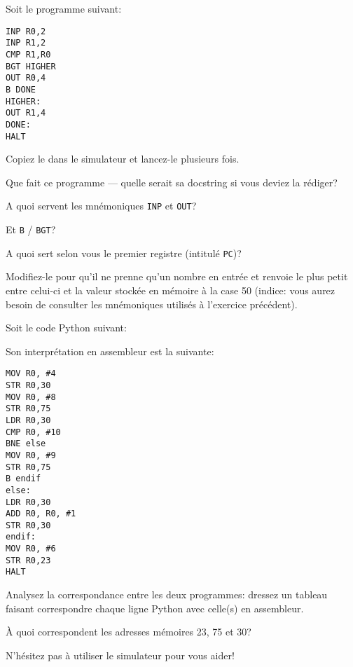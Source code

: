 \documentclass[12pt]{article}
\begin{document}
	 \begin{MonExo}
	 	Soit le programme suivant:
	 	\begin{verbatim}
INP R0,2
INP R1,2
CMP R1,R0
BGT HIGHER
OUT R0,4
B DONE
HIGHER:
OUT R1,4
DONE:
HALT
	 	\end{verbatim}
	 	Copiez le dans le simulateur et lancez-le plusieurs fois.
	 	\begin{alphenum}
	 		\item Que fait ce programme --- quelle serait sa docstring si vous deviez la rédiger?
	 		\item A quoi servent les mnémoniques \texttt{INP} et \texttt{OUT}?
	 		\item Et \texttt{B} / \texttt{BGT}?
	 		\item A quoi sert selon vous le premier registre (intitulé \texttt{PC})?
	 		\item Modifiez-le pour qu'il ne prenne qu'un nombre en entrée et renvoie le plus petit entre celui-ci et la valeur stockée en mémoire à la case 50 (indice: vous aurez besoin de consulter les mnémoniques utilisés à l'exercice précédent).
	 	\end{alphenum}
	 \end{MonExo}
	 
	 \begin{MonExo}
	 	Soit le code Python suivant:
	 	
	 	Son interprétation en assembleur est la suivante:
	 	\begin{verbatim}
MOV R0, #4
STR R0,30
MOV R0, #8
STR R0,75
LDR R0,30
CMP R0, #10
BNE else
MOV R0, #9
STR R0,75
B endif
else:
LDR R0,30
ADD R0, R0, #1
STR R0,30
endif:
MOV R0, #6
STR R0,23
HALT
	 	\end{verbatim}
	 	
		\begin{alphenum}
			\item Analysez la correspondance entre les deux programmes: dressez un tableau faisant correspondre chaque ligne Python avec celle(s) en assembleur.
			\item À quoi correspondent les adresses mémoires 23, 75 et 30?
		\end{alphenum}
		
		N'hésitez pas à utiliser le simulateur pour vous aider!
	 \end{MonExo}
	 
\end{document}
